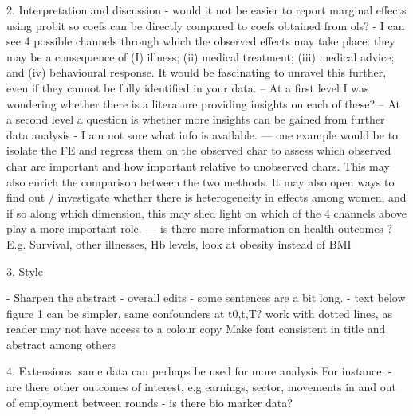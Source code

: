 2. Interpretation and discussion
- would it not be easier to report marginal effects using probit so coefs can be directly compared to coefs obtained from ols?
- I can see 4 possible channels through which the observed effects may take place: they may be a consequence of (I) illness; (ii) medical treatment; (iii) medical advice; and (iv) behavioural response.  It would be fascinating to unravel this further, even if they cannot be fully identified in your data.  
-- At a first level I was wondering whether there is a literature providing insights on each of these?  
-- At a second level a question is whether more insights can be gained from further data analysis - I am not sure what info is available.
--- one example would be to isolate the FE and regress them on the observed char to assess which observed char are important and how important relative to unobserved chars. This may also enrich the comparison between the two methods. It may also open ways to find out / investigate whether there is heterogeneity in effects among women, and if so along which dimension, this may shed light on which of the 4 channels above play a more important role.
--- is there more information on health outcomes ? E.g. Survival, other illnesses, Hb levels, look at obesity instead of BMI

3. Style

- Sharpen the abstract
- overall edits - some sentences are a bit long. 
- text below figure 1 can be simpler, same confounders at t0,t,T?  work with dotted lines, as reader may not have access to a colour copy
Make font consistent in title and abstract among others

4. Extensions: same data can perhaps be used for more analysis 
For instance: 
- are there other outcomes of interest, e.g earnings, sector, movements in and out of employment between rounds
- is there bio marker data?
 

